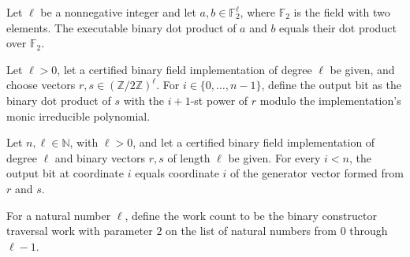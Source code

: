 \begin{theorem}
\leanok
{}
Let $\ell$ be a nonnegative integer and let $a,b\in\mathbb{F}_2^\ell$, where
$\mathbb{F}_2$ is the field with two elements. The executable binary dot product of $a$
and $b$ equals their dot product over $\mathbb{F}_2$.
\end{theorem}

\begin{definition}
\label{FABL.executableSmallBiasOutputBit}
\leanok
{}
Let $\ell>0$, let a certified binary field implementation of degree $\ell$ be given, and
choose vectors $r,s\in(\mathbb{Z}/2\mathbb{Z})^\ell$. For $i\in\{0,\ldots,n-1\}$, define
the output bit as the binary dot product of $s$ with the $i+1$-st power of $r$ modulo
the implementation's monic irreducible polynomial.
\end{definition}

\begin{theorem}
\label{FABL.executableSmallBiasOutputBit_eq_generator}
\leanok
{}
Let $n,\ell\in\mathbb N$, with $\ell>0$, and let a certified binary field implementation
of degree $\ell$ and binary vectors $r,s$ of length $\ell$ be given. For every $i<n$,
the output bit at coordinate $i$ equals coordinate $i$ of the generator vector formed
from $r$ and $s$.
\end{theorem}

\begin{definition}
\label{FABL.executableBinaryDotProductWork}
\leanok
{}
For a natural number $\ell$, define the work count to be the binary constructor traversal
work with parameter $2$ on the list of natural numbers from $0$ through $\ell-1$.
\end{definition}

